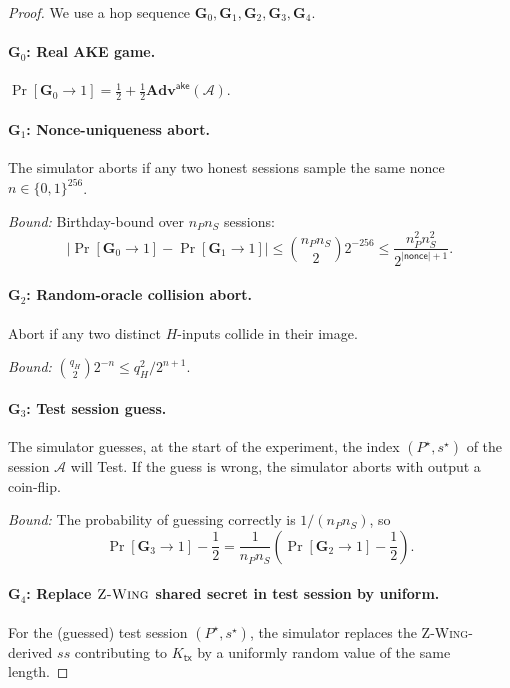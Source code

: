 \documentclass[11pt,a4paper]{article}
\theoremstyle{definition}
\theoremstyle{remark}
\newcommand{\Adv}{\ensuremath{\mathbf{Adv}}}
\providecommand{\Game}{}\renewcommand{\Game}{\ensuremath{\mathbf{G}}}
\newcommand{\zwing}{\textsc{Z-Wing}}
\newcommand{\BB}{\ensuremath{\{0,1\}}}
\begin{document}
\begin{proof}
We use a hop sequence $\Game_0, \Game_1, \Game_2, \Game_3, \Game_4$.

\paragraph{$\Game_0$: Real AKE game.}
$\Pr[\Game_0 \to 1] = \frac{1}{2} + \frac{1}{2} \Adv^{\mathsf{ake}}(\mathcal{A})$.

\paragraph{$\Game_1$: Nonce-uniqueness abort.}
The simulator aborts if any two honest sessions sample the same nonce
$n \in \BB^{256}$.

\emph{Bound:} Birthday-bound over $n_P n_S$ sessions:
\[
|\Pr[\Game_0 \to 1] - \Pr[\Game_1 \to 1]| \le \binom{n_P n_S}{2} 2^{-256} \le \frac{n_P^2 n_S^2}{2^{|\mathsf{nonce}|+1}}.
\]

\paragraph{$\Game_2$: Random-oracle collision abort.}
Abort if any two distinct $H$-inputs collide in their image.

\emph{Bound:} $\binom{q_H}{2} 2^{-n} \le q_H^2 / 2^{n+1}$.

\paragraph{$\Game_3$: Test session guess.}
The simulator guesses, at the start of the experiment, the index $(P^\star, s^\star)$
of the session $\mathcal{A}$ will Test. If the guess is wrong, the simulator
aborts with output a coin-flip.

\emph{Bound:} The probability of guessing correctly is $1/(n_P n_S)$, so
\[
\Pr[\Game_3 \to 1] - \frac{1}{2} = \frac{1}{n_P n_S}\!\left(\Pr[\Game_2 \to 1] - \frac{1}{2}\right).
\]

\paragraph{$\Game_4$: Replace $\zwing{}$ shared secret in test session by
uniform.}
For the (guessed) test session $(P^\star, s^\star)$, the simulator
replaces the \zwing{}-derived $ss$ contributing to $K_{\mathsf{tx}}$ by a
uniformly random value of the same length.


\end{proof}
\end{document}
